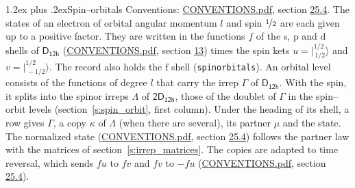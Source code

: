 \documentclass[10pt,a4paper]{article}
\makeatletter
\renewcommand\section{\@startsection{section}{1}{\z@}{-3ex plus -1ex minus -.2ex}%
  {1.2ex plus .2ex}{\normalfont\large\sffamily\bfseries\color{parttitle}}}
\numberwithin{equation}{section}
\newcommand{\grp}[1]{\mathsf{#1}}
\newcommand{\orbital}[1]{\mathrm{#1}}
\newcommand{\mult}{\kappa}
\newcommand{\intx}{\mu}
\newcommand{\jm}[2]{\bigl\lvert{}^{#1}_{\,#2}\bigr\rangle}
\makeatother
\begin{document}
\section{Spin--orbitals}\label{s:spin_orbitals}
Conventions: \href{../../CONVENTIONS.pdf}{CONVENTIONS.pdf}, section \href{../../CONVENTIONS.pdf\#conv.25.4}{25.4}.
\leavevmode\label{n:index.orbital.l}The states of an electron of orbital angular momentum $l$ and spin $\nicefrac{1}{2}$ are each given up to a positive factor. \label{n:local.spinor.uv}\label{n:local.function.f}They are written in the functions $f$ of the $\orbital{s}$, $\orbital{p}$ and $\orbital{d}$ shells of \href{../../../rotation/data/pdf/D12h.pdf}{$\grp{D_{12h}}$} (\href{../../CONVENTIONS.pdf}{CONVENTIONS.pdf}, section \href{../../../rotation/CONVENTIONS.pdf\#conv.13}{13}) times the spin kets $u = \jm{1/2}{1/2}$ and $v = \jm{1/2}{-1/2}$. The record also holds the $\orbital{f}$ shell (\texttt{spinorbitals}). An orbital level consists of the functions of degree $l$ that carry the irrep $\Gamma$ of \href{../../../rotation/data/pdf/D12h.pdf}{$\grp{D_{12h}}$}. With the spin, it splits into the spinor irreps $\Lambda$ of $\grp{2D_{12h}}$, those of the doublet of $\Gamma$ in the spin--orbit levels (section~\ref{s:spin_orbit}, first column). \label{n:head.state}Under the heading of its shell, a row gives $\Gamma$, a copy $\mult$ of $\Lambda$ (when there are several), its partner $\intx$ and the state. The normalized state (\href{../../CONVENTIONS.pdf}{CONVENTIONS.pdf}, section \href{../../CONVENTIONS.pdf\#conv.25.4}{25.4}) follows the partner law with the matrices of section~\ref{s:irrep_matrices}. The copies are adapted to time reversal, which sends $f u$ to $f v$ and $f v$ to $-f u$ (\href{../../CONVENTIONS.pdf}{CONVENTIONS.pdf}, section \href{../../CONVENTIONS.pdf\#conv.25.4}{25.4}).
\end{document}
